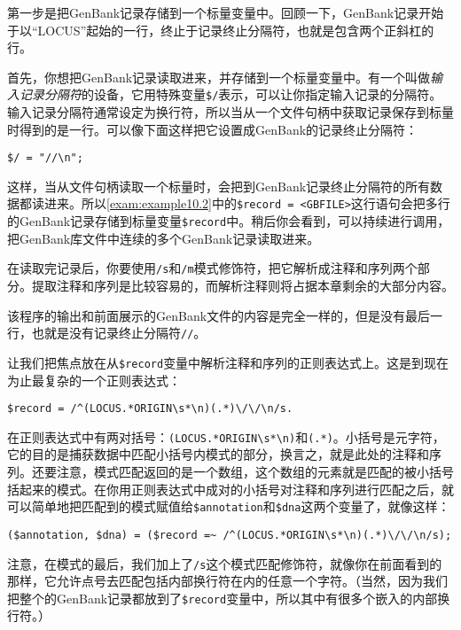 第一步是把GenBank记录存储到一个标量变量中。回顾一下，GenBank记录开始于以“LOCUS”起始的一行，终止于记录终止分隔符，也就是包含两个正斜杠的行。

首先，你想把GenBank记录读取进来，并存储到一个标量变量中。有一个叫做\textit{输入记录分隔符}的设备，它用特殊变量\verb|$/|表示，可以让你指定输入记录的分隔符。输入记录分隔符通常设定为换行符，所以当从一个文件句柄中获取记录保存到标量时得到的是一行。可以像下面这样把它设置成GenBank的记录终止分隔符：

\begin{lstlisting}
$/ = "//\n";
\end{lstlisting}

这样，当从文件句柄读取一个标量时，会把到GenBank记录终止分隔符的所有数据都读进来。所以\autoref{exam:example10.2}中的\verb|$record = <GBFILE>|这行语句会把多行的GenBank记录存储到标量变量\verb|$record|中。稍后你会看到，可以持续进行调用，把GenBank库文件中连续的多个GenBank记录读取进来。

在读取完记录后，你要使用\verb|/s|和\verb|/m|模式修饰符，把它解析成注释和序列两个部分。提取注释和序列是比较容易的，而解析注释则将占据本章剩余的大部分内容。



该程序的输出和前面展示的GenBank文件的内容是完全一样的，但是没有最后一行，也就是没有记录终止分隔符\verb|//|。

让我们把焦点放在从\verb|$record|变量中解析注释和序列的正则表达式上。这是到现在为止最复杂的一个正则表达式：

\begin{lstlisting}
$record = /^(LOCUS.*ORIGIN\s*\n)(.*)\/\/\n/s.
\end{lstlisting}

在正则表达式中有两对括号：\verb|(LOCUS.*ORIGIN\s*\n)|和\verb|(.*)|。小括号是元字符，它的目的是捕获数据中匹配小括号内模式的部分，换言之，就是此处的注释和序列。还要注意，模式匹配返回的是一个数组，这个数组的元素就是匹配的被小括号括起来的模式。在你用正则表达式中成对的小括号对注释和序列进行匹配之后，就可以简单地把匹配到的模式赋值给\verb|$annotation|和\verb|$dna|这两个变量了，就像这样：

\begin{lstlisting}
($annotation, $dna) = ($record =~ /^(LOCUS.*ORIGIN\s*\n)(.*)\/\/\n/s);
\end{lstlisting}

注意，在模式的最后，我们加上了\verb|/s|这个模式匹配修饰符，就像你在前面看到的那样，它允许点号去匹配包括内部换行符在内的任意一个字符。（当然，因为我们把整个的GenBank记录都放到了\verb|$record|变量中，所以其中有很多个嵌入的内部换行符。）

